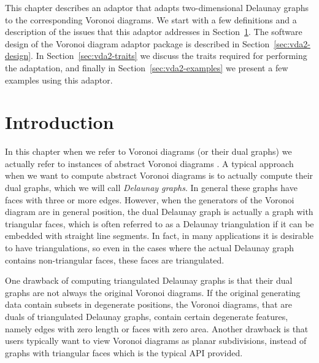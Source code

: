 
This chapter describes an adaptor that adapts two-dimensional Delaunay
graphs to the corresponding Voronoi diagrams. We start with a few
definitions and a description of the issues that this adaptor
addresses in Section~\ref{sec:vda2-intro}. The software design
of the Voronoi diagram adaptor package is described in
Section~\ref{sec:vda2-design}. In Section~\ref{sec:vda2-traits} we
discuss the traits required for performing the adaptation, and finally
in Section~\ref{sec:vda2-examples} we present a few examples using
this adaptor.

\section{Introduction}
\label{sec:vda2-intro}

In this chapter when we refer to Voronoi diagrams (or their dual
graphs) we actually refer to instances of abstract Voronoi diagrams \cite{}.
A typical approach when we want to compute abstract Voronoi diagrams is to
actually compute their dual graphs, which we will call {\em Delaunay
graphs}. In general these graphs have faces with three or more
edges. However, when the generators of the Voronoi diagram are in
general position, the dual Delaunay graph is actually a graph with
triangular faces, which is often referred to as a Delaunay
triangulation if it can be embedded with straight line segments. In
fact, in many applications it is desirable to have triangulations, so
even in the cases where the actual Delaunay graph contains
non-triangular faces, these faces are triangulated.

One drawback of computing triangulated Delaunay graphs is that their
dual graphs are not always the original Voronoi diagrams. If the
original generating data contain subsets in degenerate positions, the
Voronoi diagrams, that are duals of triangulated Delaunay graphs,
contain certain degenerate features, namely edges with zero
length or faces with zero area. Another drawback is that users
typically want to view Voronoi diagrams as planar subdivisions,
instead of graphs with triangular faces which is the typical API
provided.

